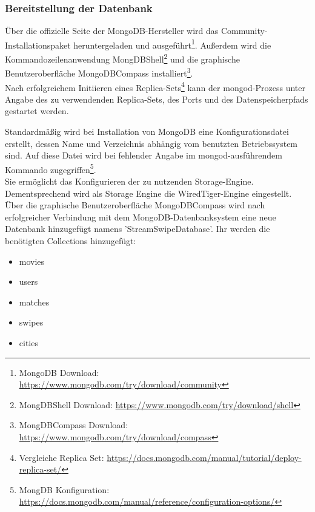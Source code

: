 \subsubsection{Bereitstellung der Datenbank}
Über die offizielle Seite der MongoDB-Hersteller wird das Community-Installationspaket heruntergeladen und ausgeführt\footnote{MongoDB Download: \url{ https://www.mongodb.com/try/download/community}}.
Außerdem wird die Kommandozeilenanwendung MongDBShell\footnote{MongDBShell Download: \url{ https://www.mongodb.com/try/download/shell}} und die
graphische Benutzeroberfläche MongoDBCompass installiert\footnote{MongDBCompass  Download: \url{https://www.mongodb.com/try/download/compass}}.\\
Nach erfolgreichem Initiieren eines Replica-Sets\footnote{Vergleiche Replica Set: \url{https://docs.mongodb.com/manual/tutorial/deploy-replica-set/}}
kann der mongod-Prozess unter Angabe des zu verwendenden Replica-Sets, des Ports und des Datenspeicherpfads gestartet werden. \newline


\noindent
Standardmäßig wird bei Installation von MongoDB eine Konfigurationsdatei erstellt, dessen Name und Verzeichnis abhängig vom benutzten Betriebssystem sind. Auf diese Datei wird bei fehlender Angabe im mongod-ausführendem Kommando zugegriffen\footnote{MongDB Konfiguration: \url{https://docs.mongodb.com/manual/reference/configuration-options/}}.\\
Sie ermöglicht das Konfigurieren der zu nutzenden Storage-Engine. Dementsprechend wird als Storage Engine die WiredTiger-Engine eingestellt. 
Über die graphische Benutzeroberfläche MongoDBCompass wird nach erfolgreicher Verbindung mit dem MongoDB-Datenbanksystem eine neue Datenbank hinzugefügt namens 'StreamSwipeDatabase'. Ihr werden die benötigten Collections hinzugefügt:

\begin{itemize}
\item movies
\item users
\item matches
\item swipes
\item cities
\end{itemize}

